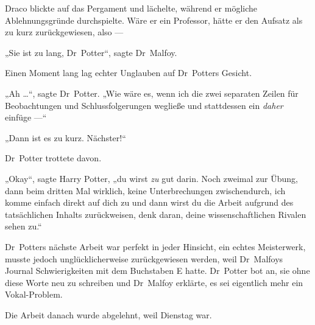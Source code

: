 Draco blickte auf das Pergament und lächelte, während er mögliche Ablehnungsgründe durchspielte. Wäre er ein Professor, hätte er den Aufsatz als zu kurz zurückgewiesen, also —

„Sie ist zu lang, Dr~Potter“, sagte Dr~Malfoy.

Einen Moment lang lag echter Unglauben auf Dr~Potters Gesicht.

„Ah …“, sagte Dr~Potter.
„Wie wäre es, wenn ich die zwei separaten Zeilen für Beobachtungen und Schlussfolgerungen wegließe und stattdessen ein \emph{daher} einfüge —“

„Dann ist es zu kurz. Nächster!“

Dr~Potter trottete davon.

„Okay“, sagte Harry Potter, „du wirst \emph{zu} gut darin. Noch zweimal zur Übung, dann beim dritten Mal wirklich, keine Unterbrechungen zwischendurch, ich komme einfach direkt auf dich zu und dann wirst du die Arbeit aufgrund des tatsächlichen Inhalts zurückweisen, denk daran, deine wissenschaftlichen Rivalen sehen zu.“

Dr~Potters nächste Arbeit war perfekt in jeder Hinsicht, ein echtes Meisterwerk, musste jedoch unglücklicherweise zurückgewiesen werden, weil Dr~Malfoys Journal Schwierigkeiten mit dem Buchstaben E hatte. Dr~Potter bot an, sie ohne diese Worte neu zu schreiben und Dr~Malfoy erklärte, es sei eigentlich mehr ein Vokal-Problem.

Die Arbeit danach wurde abgelehnt, weil Dienstag war.

